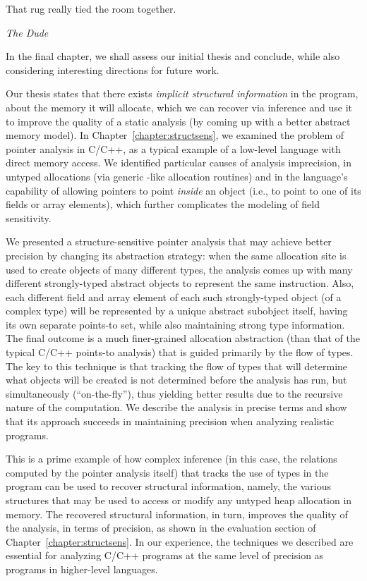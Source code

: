 \label{chapter:conclusions}
\epigraph{That rug really tied the room together.}{\textit{The Dude}}

In the final chapter, we shall assess our initial thesis and conclude,
while also considering interesting directions for future work.

Our thesis states that there exists \emph{implicit structural
  information} in the program, about the memory it will allocate,
which we can recover via inference and use it to improve the quality
of a static analysis (by coming up with a better abstract memory
model). In Chapter~\ref{chapter:structsens}, we examined the problem
of pointer analysis in C/C++, as a typical example of a low-level
language with direct memory access. We identified particular causes of
analysis imprecision, in untyped allocations (via generic
-like allocation routines) and in the language's
capability of allowing pointers to point \emph{inside} an object
(i.e., to point to one of its fields or array elements), which further
complicates the modeling of field sensitivity.

We presented a structure-sensitive pointer analysis that may achieve
better precision by changing its abstraction strategy: when the same
allocation site is used to create objects of many different types, the
analysis comes up with many different strongly-typed abstract objects
to represent the same instruction. Also, each different field and
array element of each such strongly-typed object (of a complex type)
will be represented by a unique abstract subobject itself, having its
own separate points-to set, while also maintaining strong type
information. The final outcome is a much finer-grained allocation
abstraction (than that of the typical C/C++ points-to analysis) that is
guided primarily by the flow of types. The key to this technique is
that tracking the flow of types that will determine what objects will
be created is not determined before the analysis has run, but
simultaneously (``on-the-fly''), thus yielding better results due to
the recursive nature of the computation. We describe the analysis in
precise terms and show that its approach succeeds in maintaining
precision when analyzing realistic programs.

This is a prime example of how complex inference (in this case, the
relations computed by the pointer analysis itself) that tracks the use
of types in the program can be used to recover structural information,
namely, the various structures that may be used to access or modify
any untyped heap allocation in memory. The recovered structural
information, in turn, improves the quality of the analysis, in terms
of precision, as shown in the evaluation section of
Chapter~\ref{chapter:structsens}. In our experience, the techniques we
described are essential for analyzing C/C++ programs at the same level
of precision as programs in higher-level languages.

